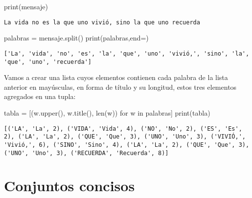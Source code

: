 \documentclass[
  letterpaper,
  DIV=11,
  numbers=noendperiod]{scrreprt}
\newenvironment{Shaded}{\begin{snugshade}}{\end{snugshade}}
\newcommand{\BuiltInTok}[1]{\textcolor[rgb]{0.00,0.23,0.31}{#1}}
\newcommand{\ControlFlowTok}[1]{\textcolor[rgb]{0.00,0.23,0.31}{#1}}
\newcommand{\KeywordTok}[1]{\textcolor[rgb]{0.00,0.23,0.31}{#1}}
\newcommand{\NormalTok}[1]{\textcolor[rgb]{0.00,0.23,0.31}{#1}}
\newcommand{\OperatorTok}[1]{\textcolor[rgb]{0.37,0.37,0.37}{#1}}
\newcommand{\StringTok}[1]{\textcolor[rgb]{0.13,0.47,0.30}{#1}}
\begin{document}
\begin{Shaded}
\begin{Highlighting}[]
\BuiltInTok{print}\NormalTok{(mensaje)}
\end{Highlighting}
\end{Shaded}

\begin{verbatim}
La vida no es la que uno vivió, sino la que uno recuerda
\end{verbatim}

\begin{Shaded}
\begin{Highlighting}[]
\NormalTok{palabras }\OperatorTok{=}\NormalTok{ mensaje.split()}
\BuiltInTok{print}\NormalTok{(palabras,end}\OperatorTok{=}\StringTok{\textquotesingle{}\textquotesingle{}}\NormalTok{)}
\end{Highlighting}
\end{Shaded}

\begin{verbatim}
['La', 'vida', 'no', 'es', 'la', 'que', 'uno', 'vivió,', 'sino', 'la', 'que', 'uno', 'recuerda']
\end{verbatim}

Vamos a crear una lista cuyos elementos contienen cada palabra de la
lista anterior en mayúsculas, en forma de título y su longitud, estos
tres elementos agregados en una tupla:

\begin{Shaded}
\begin{Highlighting}[]
\NormalTok{tabla }\OperatorTok{=}\NormalTok{ [(w.upper(), w.title(), }\BuiltInTok{len}\NormalTok{(w)) }\ControlFlowTok{for}\NormalTok{ w }\KeywordTok{in}\NormalTok{ palabras]}
\BuiltInTok{print}\NormalTok{(tabla)}
\end{Highlighting}
\end{Shaded}

\begin{verbatim}
[('LA', 'La', 2), ('VIDA', 'Vida', 4), ('NO', 'No', 2), ('ES', 'Es', 2), ('LA', 'La', 2), ('QUE', 'Que', 3), ('UNO', 'Uno', 3), ('VIVIÓ,', 'Vivió,', 6), ('SINO', 'Sino', 4), ('LA', 'La', 2), ('QUE', 'Que', 3), ('UNO', 'Uno', 3), ('RECUERDA', 'Recuerda', 8)]
\end{verbatim}


\chapter{Conjuntos concisos}\label{conjuntos-concisos}
\end{document}
